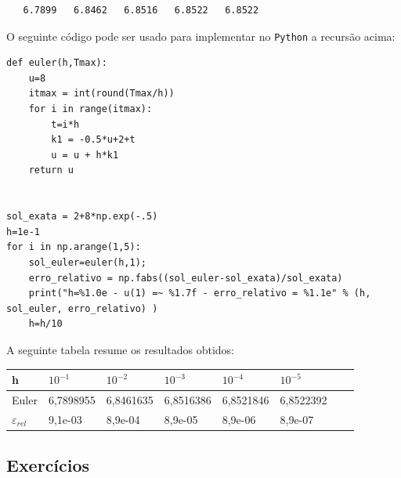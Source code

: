 \begin{resol}
\begin{verbatim}
   6.7899   6.8462   6.8516   6.8522   6.8522
\end{verbatim}
\fi


\ifispython
O seguinte código pode ser usado para implementar no \verb+Python+ a recursão acima:

\begin{verbatim}
def euler(h,Tmax):
	u=8
  	itmax = int(round(Tmax/h))
	for i in range(itmax):
		t=i*h
		k1 = -0.5*u+2+t
		u = u + h*k1
	return u


sol_exata = 2+8*np.exp(-.5)
h=1e-1
for i in np.arange(1,5):
	sol_euler=euler(h,1);
	erro_relativo = np.fabs((sol_euler-sol_exata)/sol_exata)
	print("h=%1.0e - u(1) =~ %1.7f - erro_relativo = %1.1e" % (h, sol_euler, erro_relativo) )
	h=h/10
\end{verbatim}
\fi
A seguinte tabela resume os resultados obtidos:
\begin{center}
 \begin{tabular}{|l|l|l|l|l|l|l|l|}%
\hline
   h&$10^{-1}$&$10^{-2}$&$10^{-3}$&$10^{-4}$&$10^{-5}$\\
   \hline
  Euler & 6,7898955 &  6,8461635  &  6,8516386  &  6,8521846  &  6,8522392  \\
   \hline
   $\varepsilon_{rel}$ &9,1e-03 &  8,9e-04  & 8,9e-05&   8,9e-06 &  8,9e-07\\
    \hline
  \end{tabular}
\end{center}



\end{resol}

\subsection*{Exercícios}

